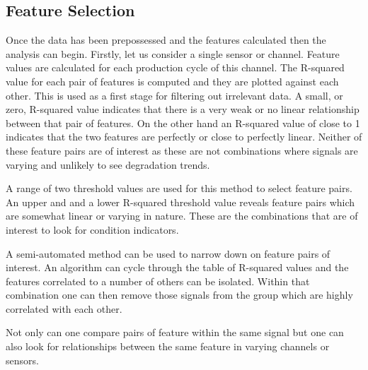 \documentclass{article}
\begin{document}

 

\subsection{Feature Selection}
Once the data has been prepossessed and the features calculated then the analysis can begin. Firstly, let us consider a single sensor or channel. Feature values are calculated for each production cycle of this channel. The R-squared value for each pair of features is computed and they are plotted against each other. This is used as a first stage for filtering out irrelevant data. A small, or zero, R-squared value indicates that there is a very weak or no linear relationship between that pair of features. On the other hand an R-squared value of close to 1 indicates that the two features are perfectly or close to perfectly linear. Neither of these feature pairs are of interest as these are not combinations where signals are varying and unlikely to see degradation trends. 

A range of two threshold values are used for this method to select feature pairs. An upper and and a lower R-squared threshold value reveals feature pairs which are somewhat linear or varying in nature. These are the combinations that are of interest to look for condition indicators.

A semi-automated method can be used to narrow down on feature pairs of interest. An algorithm can cycle through the table of R-squared values and the features correlated to a number of others can be isolated. Within that combination one can then remove those signals from the group which are highly correlated with each other.

Not only can one compare pairs of feature within the same signal but one can also look for relationships between the same feature in varying channels or sensors. 
\end{document}
